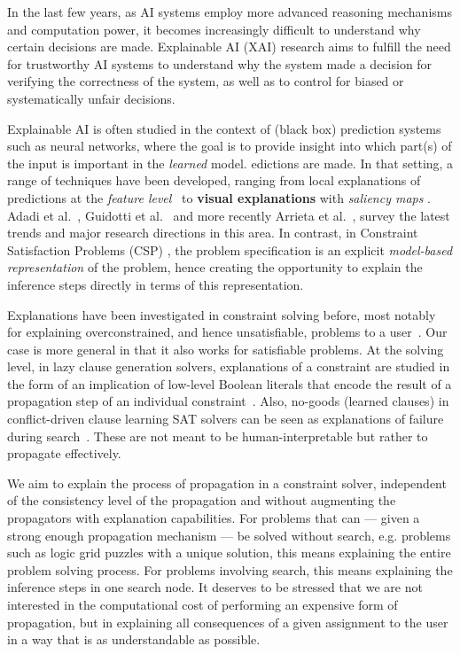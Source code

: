 In the last few years, as AI systems employ more advanced reasoning mechanisms and computation power, it becomes increasingly difficult to understand why certain decisions are made. 
Explainable AI (XAI) research aims to fulfill the need for trustworthy AI systems to understand why the system made a decision for verifying the correctness of the system, as well as to control for biased or systematically unfair decisions.

Explainable AI is often studied in the context of (black box) prediction systems such as neural networks, where the goal is to provide insight into which part(s) of the input is important in the \textit{learned} model. 
edictions are made. 
In that setting, a range of techniques have been developed, ranging from local explanations of predictions at the \textit{feature level}~\cite{ribeiro2016should,lundberg2017unified} to \textbf{visual explanations} with \textit{saliency maps} \cite{selvaraju2017grad}. %
Adadi et al.~\cite{Adadi_2018}, Guidotti et al.~\cite{guidotti2018survey} and more recently Arrieta et al.~\cite{Barredo_Arrieta_2020}, survey the latest trends and  major research directions in this area.
In contrast, in Constraint Satisfaction Problems (CSP) \cite{fai/Rossi06}, the problem specification is an explicit \textit{model-based representation} of the problem, hence creating the opportunity to explain the inference steps directly in terms of this representation.

Explanations have been investigated in constraint solving before, most notably for explaining overconstrained, and hence unsatisfiable, problems to a user~\cite{junker2001quickxplain}.
Our case is more general in that it also works for satisfiable problems.
At the solving level, in lazy clause generation solvers, explanations of a constraint are studied in the form of an implication of low-level Boolean literals that encode the result of a propagation step of an individual constraint~\cite{feydy2009lazy}. 
Also, no-goods (learned clauses) in conflict-driven clause learning SAT solvers can be seen as explanations of failure during search~\cite{marques2009conflict}. 
These are not meant to be human-interpretable but rather to propagate effectively.

We aim to explain the process of propagation in a constraint solver, independent of the consistency level of the propagation and without augmenting the propagators with explanation capabilities.
For problems that can --- given a strong enough propagation mechanism --- be solved without search, e.g. problems such as logic grid puzzles with a unique solution, this means explaining the entire problem solving process. 
For problems involving search, this means explaining the inference steps  in one search node. 
It deserves to be stressed that we are not interested in the computational cost of performing an expensive form of propagation, but in explaining all consequences of a given assignment to the user in a way that is as understandable as possible. 

